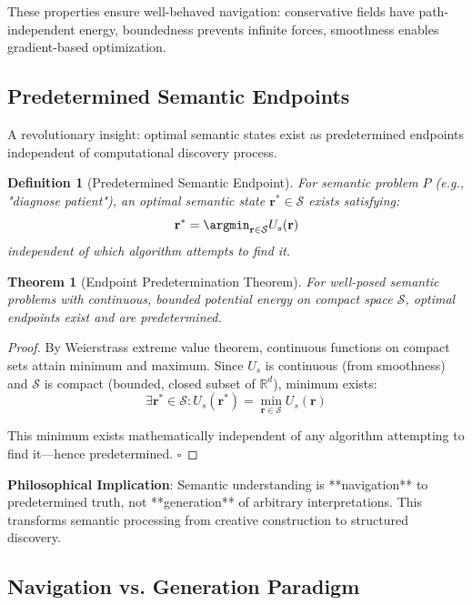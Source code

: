 \documentclass[12pt,a4paper]{article}
\newtheorem{theorem}{Theorem}
\newtheorem{definition}{Definition}
\begin{document}
These properties ensure well-behaved navigation: conservative fields have path-independent energy, boundedness prevents infinite forces, smoothness enables gradient-based optimization.

\subsection{Predetermined Semantic Endpoints}

A revolutionary insight: optimal semantic states exist as predetermined endpoints independent of computational discovery process.

\begin{definition}[Predetermined Semantic Endpoint]
For semantic problem $P$ (e.g., "diagnose patient"), an optimal semantic state $\mathbf{r}^* \in \mathcal{S}$ exists satisfying:
\begin{equation}
\mathbf{r}^* = \argmin_{\mathbf{r} \in \mathcal{S}} U_s(\mathbf{r})
\end{equation}
independent of which algorithm attempts to find it.
\end{definition}

\begin{theorem}[Endpoint Predetermination Theorem]
For well-posed semantic problems with continuous, bounded potential energy on compact space $\mathcal{S}$, optimal endpoints exist and are predetermined.
\end{theorem}

\begin{proof}
By Weierstrass extreme value theorem, continuous functions on compact sets attain minimum and maximum. Since $U_s$ is continuous (from smoothness) and $\mathcal{S}$ is compact (bounded, closed subset of $\mathbb{R}^d$), minimum exists:
\begin{equation}
\exists \mathbf{r}^* \in \mathcal{S}: U_s(\mathbf{r}^*) = \min_{\mathbf{r} \in \mathcal{S}} U_s(\mathbf{r})
\end{equation}

This minimum exists mathematically independent of any algorithm attempting to find it—hence predetermined. $\square$
\end{proof}

\textbf{Philosophical Implication}: Semantic understanding is **navigation** to predetermined truth, not **generation** of arbitrary interpretations. This transforms semantic processing from creative construction to structured discovery.

\subsection{Navigation vs. Generation Paradigm}
\end{document}
